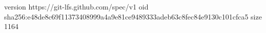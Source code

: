 version https://git-lfs.github.com/spec/v1
oid sha256:e48de8c69f11373408999a4a9e81ce9489333adeb63c8fec84e9130c101cfca5
size 1164
